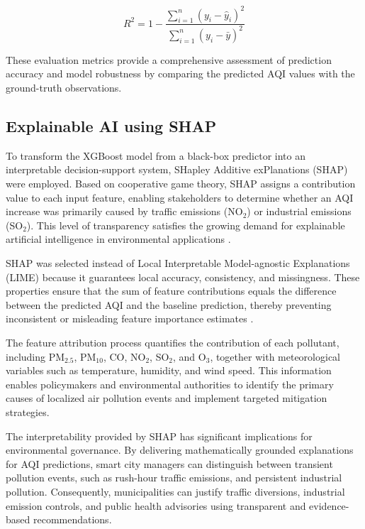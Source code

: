 \documentclass[conference]{IEEEtran}
\begin{document}
\begin{equation}
R^2
=
1-
\frac{
\sum_{i=1}^{n}
\left(y_i-\hat{y}_i\right)^2
}{
\sum_{i=1}^{n}
\left(y_i-\bar{y}\right)^2
}
\end{equation}

These evaluation metrics provide a comprehensive assessment
of prediction accuracy and model robustness by comparing the
predicted AQI values with the ground-truth observations.

\subsection{Explainable AI using SHAP}

To transform the XGBoost model from a black-box predictor
into an interpretable decision-support system, SHapley
Additive exPlanations (SHAP) were employed. Based on
cooperative game theory, SHAP assigns a contribution value
to each input feature, enabling stakeholders to determine
whether an AQI increase was primarily caused by traffic
emissions (NO$_2$) or industrial emissions (SO$_2$). This
level of transparency satisfies the growing demand for
explainable artificial intelligence in environmental
applications \cite{b26,b27}.

SHAP was selected instead of Local Interpretable
Model-agnostic Explanations (LIME) because it guarantees
local accuracy, consistency, and missingness. These
properties ensure that the sum of feature contributions equals
the difference between the predicted AQI and the baseline
prediction, thereby preventing inconsistent or misleading
feature importance estimates \cite{b26,b28}.

The feature attribution process quantifies the contribution of
each pollutant, including PM$_{2.5}$, PM$_{10}$, CO,
NO$_2$, SO$_2$, and O$_3$, together with meteorological
variables such as temperature, humidity, and wind speed.
This information enables policymakers and environmental
authorities to identify the primary causes of localized air
pollution events and implement targeted mitigation
strategies.

The interpretability provided by SHAP has significant
implications for environmental governance. By delivering
mathematically grounded explanations for AQI predictions,
smart city managers can distinguish between transient
pollution events, such as rush-hour traffic emissions, and
persistent industrial pollution. Consequently, municipalities
can justify traffic diversions, industrial emission controls,
and public health advisories using transparent and
evidence-based recommendations.
\end{document}
